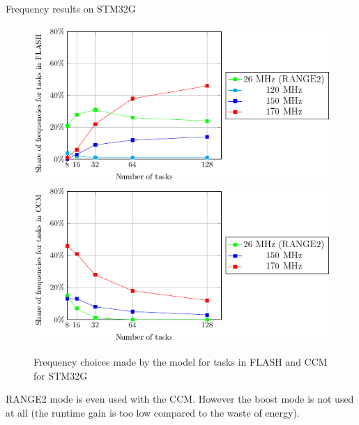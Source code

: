 \documentclass[
	11pt, %
]{beamer}
\begin{document}
\begin{frame}{Frequency results on STM32G}
	\begin{figure}
        \includegraphics[scale = 0.6]{data/model/f_choose_32g_flash.pdf}
		\includegraphics[scale = 0.6]{data/model/f_choose_32g_ccm.pdf}
		\caption{Frequency choices made by the model for tasks in FLASH and CCM for STM32G}
	\end{figure}
RANGE2 mode is even used with the CCM. 
However the boost mode is not used at all (the runtime gain is too low compared to the waste of energy).
\end{frame}
\end{document}
